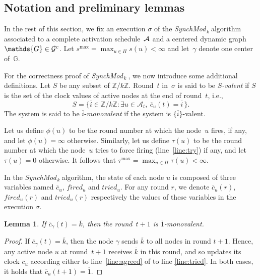 \documentclass{article}
\newtheorem{lemma}{Lemma}[section]
\newcommand{\cent}{\gamma}
\newcommand{\dG}{\mathds{G}}
\newcommand{\tf}{\phi}
\newcommand{\try}{\tau}
\newcommand{\SM}{{\em SynchMod}$_{\,k}\ $}
\begin{document}
\subsection{Notation and preliminary lemmas}

In the rest of this section, we fix an execution $\sigma$ of the \SM algorithm associated to a complete activation 
	schedule~${\cal A}$ and a centered dynamic graph~$\dG \in {\cal G}^c$. %
Let $s^{\max} = \max_{u \in \Pi} s(u) < \infty$ and let~$\cent$ denote one center of~$\dG$.	


For the correctness proof of \SM, we now introduce some additional definitions.
Let $S$ be any subset of $ \mathds{Z}/k\mathds{Z}$.
Round~$t$ in~$\sigma$  is said to be \emph{$S$-valent}  if $S$ is the set of the clock values of active nodes 
	at the end of round~$t$, i.e.,
	$$ S = \{ \overline{i}  \in \mathds{Z}/k\mathds{Z} : \exists u \in \mathcal{A}_t, \ \overline{c}_u (t) = \overline{ i }\,  \}  . $$
The system is said to be $\overline{i}$-\emph{monovalent}  if the system is $\{ \overline{i}\}$-valent.

Let us define $\tf (u)$ to be the round number at which the node~$u$ fires, if any, and let $\tf(u) = \infty$ otherwise.
Similarly, let us define $\try (u)$ to be  the round number at which the node~$u$ tries to force firing
	(line~\ref{line:try}) if any, and let $\try (u)= 0$ otherwise.
It follows that $\try^{\max} =  \max_{u \in \Pi}  \try(u) < \infty$.

In the \SM algorithm, the state of each node $u$ is composed of three variables named $\overline{c}_u$, $fired_u$ and $tried_u$.
For any round $r$, we denote $\overline{c}_u(r)$, $fired_u(r)$ and $tried_u(r)$ respectively the values of these variables in the execution $\sigma$.

\begin{lemma}\label{lem:k_mono}
If $\overline{c}_\cent(t) = \overline{k} $, then the round~$t +1$  is $\overline{1}$-monovalent.
\end{lemma}
\begin{proof}
If $\overline{c}_\cent(t) = \overline{k} $, then the node $\cent$ sends $\overline{k}$ to all nodes in round $t+1$.
Hence, any active node $u$ at round~$t+1$ receives $\overline{k}$ in this round,
	and so updates its clock $\overline{c}_u$ according either to line~\ref{line:agreed} of to line \ref{line:tried}.
In both cases, it holds that $\overline{c}_u (t+1) =\overline{1}$.
\end{proof}
\end{document}
